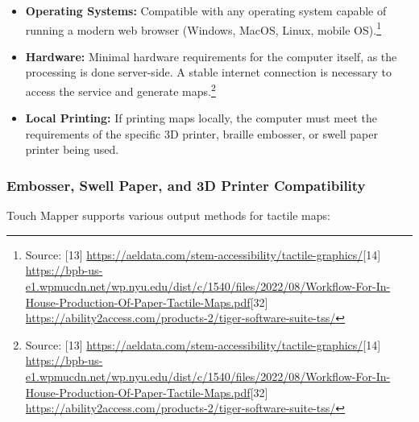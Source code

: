 \begin{itemize}
    \item \textbf{Operating Systems:} Compatible with any operating system capable of running a modern web browser (Windows, MacOS, Linux, mobile OS).\footnote{Source: [13] \url{https://aeldata.com/stem-accessibility/tactile-graphics/}[14] \url{https://bpb-us-e1.wpmucdn.net/wp.nyu.edu/dist/c/1540/files/2022/08/Workflow-For-In-House-Production-Of-Paper-Tactile-Maps.pdf}[32] \url{https://ability2access.com/products-2/tiger-software-suite-tss/}}
    \item \textbf{Hardware:} Minimal hardware requirements for the computer itself, as the processing is done server-side. A stable internet connection is necessary to access the service and generate maps.\footnote{Source: [13] \url{https://aeldata.com/stem-accessibility/tactile-graphics/}[14] \url{https://bpb-us-e1.wpmucdn.net/wp.nyu.edu/dist/c/1540/files/2022/08/Workflow-For-In-House-Production-Of-Paper-Tactile-Maps.pdf}[32] \url{https://ability2access.com/products-2/tiger-software-suite-tss/}}
    \item \textbf{Local Printing:} If printing maps locally, the computer must meet the requirements of the specific 3D printer, braille embosser, or swell paper printer being used.
\end{itemize}

\subsubsection{Embosser, Swell Paper, and 3D Printer Compatibility}

Touch Mapper supports various output methods for tactile maps:

